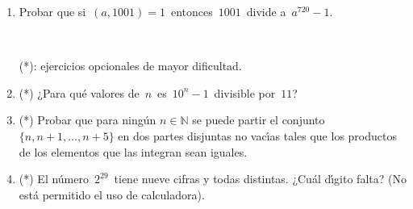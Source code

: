 \documentclass[a4paper,12pt,twoside,spanish,reqno]{amsbook}
\numberwithin{equation}{section}
\begin{document}
\begin{enumerate}
%

%
\item Probar que si \,$(a,1001)=1$\, entonces \,$1001$\, divide a \,$a^{720}-1$.




\


\noindent (*): ejercicios opcionales de mayor dificultad.


\item (*) ¿Para qu\'e valores de \,$n$\, es \,$10^n-1$\, divisible por \,$11$?



\item (*) Probar que para ning\'un $n\in\mathbb N$ se puede partir el conjunto $\{n,n+1,\ldots, n+5\}$ en dos partes
disjuntas no vac\'\i as tales que los productos de los elementos que las integran sean iguales.


\item (*) El n\'umero \,$2^{29}$\, tiene nueve cifras y todas distintas.
¿Cu\'al d\'\i gito falta? (No est\'a permitido el uso de calculadora).



\end{enumerate}
\end{document}

